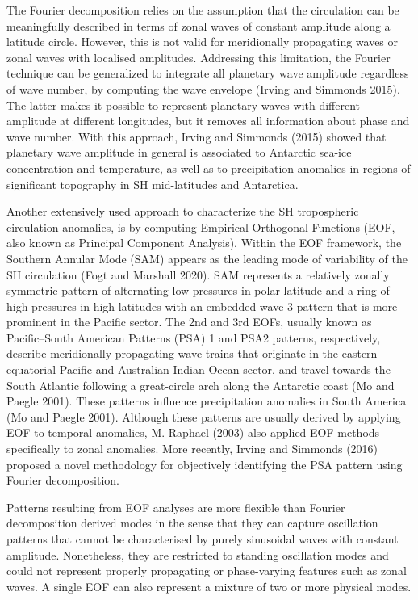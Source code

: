 \documentclass[smallextended]{svjour3}       %
\begin{document}
The Fourier decomposition relies on the assumption that the circulation can be meaningfully described in terms of zonal waves of constant amplitude along a latitude circle.
However, this is not valid for meridionally propagating waves or zonal waves with localised amplitudes.
Addressing this limitation, the Fourier technique can be generalized to integrate all planetary wave amplitude regardless of wave number, by computing the wave envelope (Irving and Simmonds 2015).
The latter makes it possible to represent planetary waves with different amplitude at different longitudes, but it removes all information about phase and wave number.
With this approach, Irving and Simmonds (2015) showed that planetary wave amplitude in general is associated to Antarctic sea-ice concentration and temperature, as well as to precipitation anomalies in regions of significant topography in SH mid-latitudes and Antarctica.

Another extensively used approach to characterize the SH tropospheric circulation anomalies, is by computing Empirical Orthogonal Functions (EOF, also known as Principal Component Analysis).
Within the EOF framework, the Southern Annular Mode (SAM) appears as the leading mode of variability of the SH circulation (Fogt and Marshall 2020).
SAM represents a relatively zonally symmetric pattern of alternating low pressures in polar latitude and a ring of high pressures in high latitudes with an embedded wave 3 pattern that is more prominent in the Pacific sector.
The 2nd and 3rd EOFs, usually known as Pacific--South American Patterns (PSA) 1 and PSA2 patterns, respectively, describe meridionally propagating wave trains that originate in the eastern equatorial Pacific and Australian-Indian Ocean sector, and travel towards the South Atlantic following a great-circle arch along the Antarctic coast (Mo and Paegle 2001).
These patterns influence precipitation anomalies in South America (Mo and Paegle 2001).
Although these patterns are usually derived by applying EOF to temporal anomalies, M. Raphael (2003) also applied EOF methods specifically to zonal anomalies.
More recently, Irving and Simmonds (2016) proposed a novel methodology for objectively identifying the PSA pattern using Fourier decomposition.

Patterns resulting from EOF analyses are more flexible than Fourier decomposition derived modes in the sense that they can capture oscillation patterns that cannot be characterised by purely sinusoidal waves with constant amplitude.
Nonetheless, they are restricted to standing oscillation modes and could not represent properly propagating or phase-varying features such as zonal waves.
A single EOF can also represent a mixture of two or more physical modes.
\end{document}
